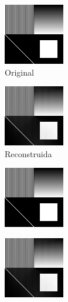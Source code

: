 \documentclass{beamer}
\begin{document}
\begin{frame}
    \begin{minipage}[t]{0.4\linewidth}
        \begin{center}
            \includegraphics[scale=1.25]{fig/no_homogenea.png}\\         Original
        \end{center}
    \end{minipage}
    \hfill
    \begin{minipage}[t]{0.4\linewidth}
        \begin{center}
            \includegraphics[scale=1.25]{fig/no_homogenea_comprimida.png}\\
            Reconstruida
        \end{center}
    \end{minipage}

\end{frame}

\begin{frame}
    \begin{center}
        \includegraphics[scale=2]{fig/no_homogenea.png}
    \end{center}
\end{frame}
\begin{frame}
    \begin{center}
        \includegraphics[scale=2]{fig/no_homogenea_comprimida.png}
    \end{center}
\end{frame}
\end{document}
